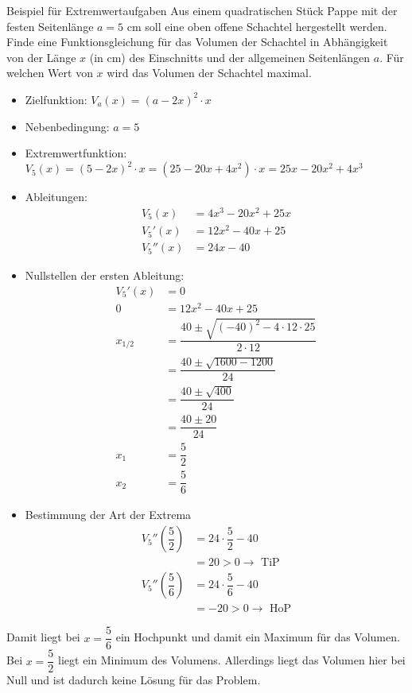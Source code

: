  \begin{bsp}{Beispiel für Extremwertaufgaben}{}
Aus einem quadratischen Stück Pappe mit der festen Seitenlänge $a = 5\text{ cm}$ soll eine oben offene Schachtel hergestellt werden. Finde eine Funktionsgleichung für das Volumen der Schachtel in Abhängigkeit von der Länge $x$ (in cm) des Einschnitts und der allgemeinen Seitenlängen $a$. Für welchen Wert von $x$ wird das Volumen der Schachtel maximal. 
\begin{itemize}
    \item Zielfunktion: $V_a(x) = \left(a-2x\right)^2 \cdot x$
    \item Nebenbedingung: $a = 5$
    \item Extremwertfunktion: $V_5(x) = \left(5-2x\right)^2 \cdot x = \left(25 -20x +4x^2\right)\cdot x = 25x-20x^2 +4x^3$
    \item Ableitungen:
    \begin{equation*}
        \begin{split}
            V_5(x) &= 4x^3 -20x^2 +25x\\
          V_5'(x) &= 12x^2 -40x +25\\
          V_5''(x) &= 24x-40
        \end{split}
    \end{equation*}
    \item Nullstellen der ersten Ableitung:
        \begin{equation*}
        \begin{split}
          V_5'(x) &= 0\\
        0&= 12x^2 -40x +25\\
        x_{1/2} &= \dfrac{40 \pm \sqrt{(-40)^2 -4\cdot 12\cdot 25}}{2\cdot 12}\\
        &= \dfrac{40 \pm \sqrt{1600 -1200}}{24}\\
        &= \dfrac{40 \pm \sqrt{400}}{24}\\
        &= \dfrac{40 \pm 20}{24}\\
        x_1&= \dfrac{5}{2}\\
        x_2&= \dfrac{5}{6}
        \end{split}
    \end{equation*}
    \item Bestimmung der Art der Extrema
            \begin{equation*}
        \begin{split}
          V_5''\left(\dfrac{5}{2}\right) &= 24\cdot \dfrac{5}{2} -40\\
          &= 20>0 \longrightarrow \text{ TiP}\\
          V_5''\left(\dfrac{5}{6}\right) &= 24\cdot \dfrac{5}{6} -40\\
          &= -20 >0 \longrightarrow \text{ HoP}
        \end{split}
    \end{equation*}
\end{itemize}
Damit liegt bei $x= \dfrac{5}{6}$ ein Hochpunkt und damit ein Maximum für das Volumen. Bei $x= \dfrac{5}{2}$ liegt ein Minimum des Volumens. Allerdings liegt das Volumen hier bei Null und ist dadurch keine Lösung für das Problem.
\end{bsp}